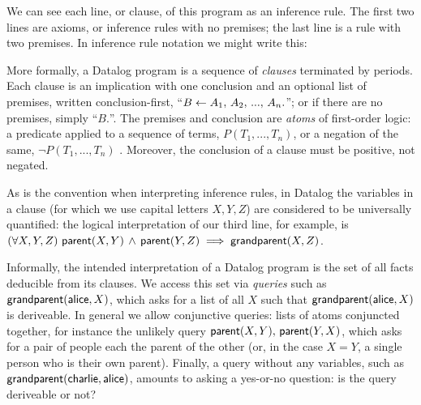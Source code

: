 \noindent
We can see each line, or clause, of this program as an inference rule. The first
two lines are axioms, or inference rules with no premises; the last line is a
rule with two premises. In inference rule notation we might write this:
%
\begin{mathpar}


\end{mathpar}

\noindent
More formally, a Datalog program is a sequence of \emph{clauses} terminated by
periods. Each clause is an implication with one conclusion and an optional list
of premises, written conclusion-first, ``$B \gets A_1 \conj A_2 \conj ... \conj
A_n.$''; or if there are no premises, simply ``$B.$''. The premises and
conclusion are \emph{atoms} of first-order logic: a predicate applied to a
sequence of terms, $P(T_1, ..., T_n)$, or a negation of the same, $\neg P(T_1,
..., T_n)$%
.
%
%
Moreover, the conclusion of a clause must be positive, not negated.
%

As is the convention when interpreting inference rules, in Datalog the variables
in a clause (for which we use capital letters $X,Y,Z$) are considered to be
universally quantified: the logical interpretation of our third line, for
example, is $\fa{X, Y, Z} \atom{parent}{X, Y} \wedge \atom{parent}{Y, Z}
\implies \atom{grandparent}{X, Z}$.

Informally, the intended interpretation of a Datalog program is the set of all
facts deducible from its clauses.
%
We access this set via \emph{queries} such as
$\atom{grandparent}{\datum{alice},X}$, which asks for a list of all $X$ such
that $\atom{grandparent}{\datum{alice},X}$ is deriveable. In general we allow
conjunctive queries: lists of atoms conjuncted together, for instance the
unlikely query $\atom{parent}{X,Y} \conj \atom{parent}{Y,X}$, which asks for a
pair of people each the parent of the other (or, in the case $X = Y$, a single
person who is their own parent). Finally, a query without any variables, such as
$\atom{grandparent}{\datum{charlie}, \datum{alice}}$, amounts to asking a
yes-or-no question: is the query deriveable or not?

